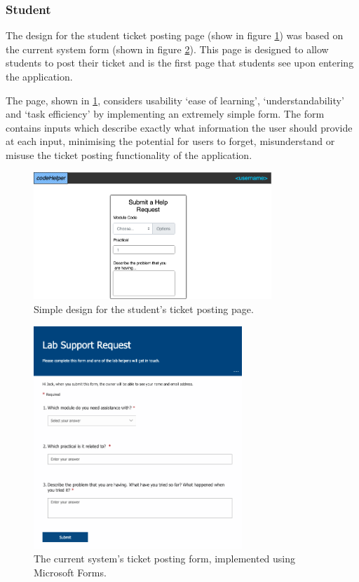 \subsubsection{Student}

The design for the student ticket posting page (show in figure \ref{fig:postTicket}) was based on the current system form (shown in figure \ref{fig:currentPostTicket}). This page is designed to allow students to post their ticket and is the first page that students see upon entering the application.

The page, shown in \ref{fig:postTicket}, considers usability `ease of learning', `understandability' and `task efficiency' by implementing an extremely simple form. The form contains inputs which describe exactly what information the user should provide at each input, minimising the potential for users to forget, misunderstand or misuse the ticket posting functionality of the application. 

\begin{figure}[H]
    \centering
    \includegraphics[width=0.8\textwidth]{7design/images/postTicket.png}
    \caption{Simple design for the student's ticket posting page.}
    \label{fig:postTicket}
\end{figure}

\begin{figure}[H]
    \centering
    \includegraphics[width=0.7\textwidth]{7design/images/currentSystemForm.png}
    \caption{The current system's ticket posting form, implemented using Microsoft Forms.}
    \label{fig:currentPostTicket}
\end{figure}

